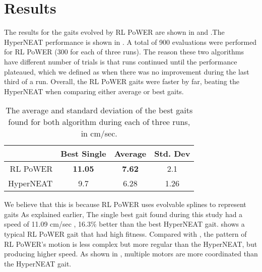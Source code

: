 \section{Results}

The results for the gaits evolved by RL PoWER are shown in  and .The HyperNEAT performance is shown in . A total of 900 evaluations were performed for RL PoWER (300 for each of three runs). The reason these two algorithms have different number of trials is that runs continued until the performance plateaued, which we defined as when there was no improvement during the last third of a run. Overall, the RL PoWER gaits were
faster by far, beating the HyperNEAT when comparing
either average or best gaits.



\begin{table}
\begin{center}
\begin{tabular}{|r|c|c|c|}
\hline
                                & Best Single & Average  & Std. Dev \\
\hline                                    
\hline                                    
RL PoWER                       & {\bf 11.05} & {\bf 7.62}   &    2.1   \\
\hline
HyperNEAT                       & 9.7 & 6.28   & 1.26   \\
\hline
\end{tabular}
\caption{The average and standard deviation of the best gaits found
  for both algorithm during each of three runs, in cm/sec.}
\end{center}
\end{table}



We believe that this is because RL PoWER uses evolvable splines to represent gaits As explained earlier,  
The single best gait found during this study had a speed of 11.09 cm/sec ,  16.3\% better than the best HyperNEAT gait.  shows a typical RL PoWER gait that had high fitness. Compared with , the pattern of RL PoWER's motion is less
complex but more regular than the HyperNEAT, but producing higher speed. As shown in 
, multiple motors are more coordinated than the HyperNEAT gait.

